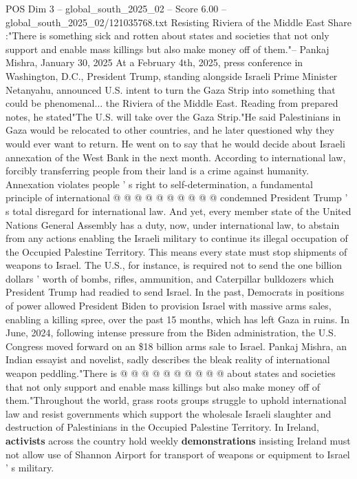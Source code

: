 \begin{textsample}{POS Dim 3 – global\_south\_2025\_02 – Score 6.00 – global\_south\_2025\_02/121035768.txt}  \label{ex:f3_pos_415}
Resisting Riviera of the Middle East Share :"There is something sick and rotten about states and societies that not only support and enable mass killings but also make money off of them."-- Pankaj Mishra, January 30, 2025 At a February 4th, 2025, press conference in Washington, D.C., President Trump, standing alongside Israeli Prime Minister Netanyahu, announced U.S. intent to turn the Gaza Strip into something that could be phenomenal... the Riviera of the Middle East.
Reading from prepared notes, he stated"The U.S. will take over the Gaza Strip."He said Palestinians in Gaza would be relocated to other countries, and he later questioned why they would ever want to return.
He went on to say that he would decide about Israeli annexation of the West Bank in the next month.
According to international law, forcibly transferring people from their land is a crime against humanity.
Annexation violates people ' s right to self-determination, a fundamental principle of international @ @ @ @ @ @ @ @ @ @ condemned President Trump ' s total disregard for international law.
And yet, every member state of the United Nations General Assembly has a duty, now, under international law, to abstain from any actions enabling the Israeli military to continue its illegal occupation of the Occupied Palestine Territory.
This means every state must stop shipments of weapons to Israel.
The U.S., for instance, is required not to send the one billion dollars ' worth of bombs, rifles, ammunition, and Caterpillar bulldozers which President Trump had readied to send Israel.
In the past, Democrats in positions of power allowed President Biden to provision Israel with massive arms sales, enabling a killing spree, over the past 15 months, which has left Gaza in ruins.
In June, 2024, following intense pressure from the Biden administration, the U.S.
Congress moved forward on an \$18 billion arms sale to Israel.
Pankaj Mishra, an Indian essayist and novelist, sadly describes the bleak reality of international weapon peddling."There is @ @ @ @ @ @ @ @ @ @ about states and societies that not only support and enable mass killings but also make money off of them."Throughout the world, grass roots groups struggle to uphold international law and resist governments which support the wholesale Israeli slaughter and destruction of Palestinians in the Occupied Palestine Territory.
In Ireland, \textbf{activists} across the country hold weekly \textbf{demonstrations} insisting Ireland must not allow use of Shannon Airport for transport of weapons or equipment to Israel ' s military.

\end{textsample}
